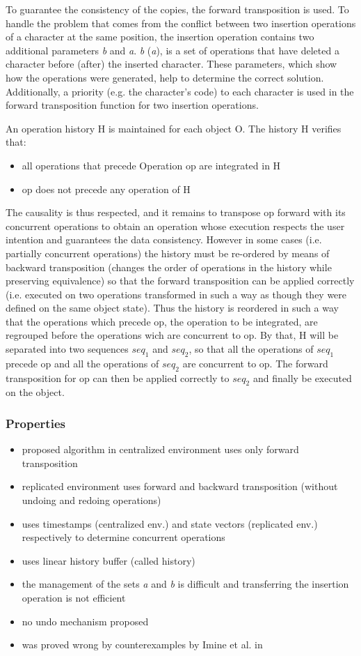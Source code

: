 To guarantee the consistency of the copies, the forward transposition is used. To handle the problem that comes from the conflict between two insertion operations of a character at the same position, the insertion operation contains two additional parameters \emph{b} and \emph{a}. \emph{b} (\emph{a}), is a set of operations that have deleted a character before (after) the inserted character. These parameters, which show how the operations were generated, help to determine the correct solution. Additionally, a priority (e.g. the character's code) to each character is used in the forward transposition function for two insertion operations.

An operation history H is maintained for each object O. The history H verifies that:
\begin{itemize}
 \item all operations that precede Operation op are integrated in H
 \item op does not precede any operation of H
\end{itemize}
The causality is thus respected, and it remains to transpose op forward with its concurrent operations to obtain an operation whose execution respects the user intention and guarantees the data consistency. However in some cases (i.e. partially concurrent operations) the history must be re-ordered by means of backward transposition (changes the order of operations in the history while preserving equivalence) so that the forward transposition can be applied correctly (i.e. executed on two operations transformed in such a way as though they were defined on the same object state). Thus the history is reordered in such a way that the operations which precede op, the operation to be integrated, are regrouped before the operations wich are concurrent to op. By that, H will be separated into two sequences $seq_1$ and $seq_2$, so that all the operations of $seq_1$ precede op and all the operations of $seq_2$ are concurrent to op. The forward transposition for op can then be applied correctly to $seq_2$ and finally be executed on the object.

\subsubsection{Properties}
\begin{itemize}
 \item proposed algorithm in centralized environment uses only forward transposition
 \item replicated environment uses forward and backward transposition (without undoing and redoing operations)
 \item uses timestamps (centralized env.) and state vectors (replicated env.) respectively to determine concurrent operations
 \item uses linear history buffer (called history) 
 \item the management of the sets \emph{a} and \emph{b} is difficult and transferring the insertion operation is not efficient
 \item no undo mechanism proposed
 \item was proved wrong by counterexamples by Imine et al. in \cite{imine04}
\end{itemize}
